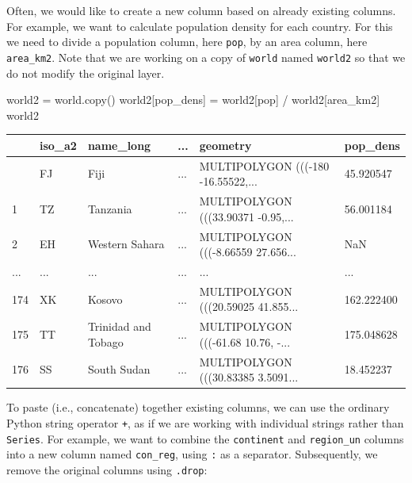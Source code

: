 \documentclass[
  letterpaper,
]{krantz}
\newenvironment{Shaded}{\begin{snugshade}}{\end{snugshade}}
\newcommand{\NormalTok}[1]{\textcolor[rgb]{0.00,0.23,0.31}{#1}}
\newcommand{\OperatorTok}[1]{\textcolor[rgb]{0.37,0.37,0.37}{#1}}
\newcommand{\StringTok}[1]{\textcolor[rgb]{0.13,0.47,0.30}{#1}}
\begin{document}
Often, we would like to create a new column based on already existing
columns. For example, we want to calculate population density for each
country. For this we need to divide a population column, here
\texttt{pop}, by an area column, here \texttt{area\_km2}. Note that we
are working on a copy of \texttt{world} named \texttt{world2} so that we
do not modify the original layer.

\begin{Shaded}
\begin{Highlighting}[]
\NormalTok{world2 }\OperatorTok{=}\NormalTok{ world.copy()}
\NormalTok{world2[}\StringTok{\textquotesingle{}pop\_dens\textquotesingle{}}\NormalTok{] }\OperatorTok{=}\NormalTok{ world2[}\StringTok{\textquotesingle{}pop\textquotesingle{}}\NormalTok{] }\OperatorTok{/}\NormalTok{ world2[}\StringTok{\textquotesingle{}area\_km2\textquotesingle{}}\NormalTok{]}
\NormalTok{world2}
\end{Highlighting}
\end{Shaded}

\begin{longtable}[]{@{}llllll@{}}
\toprule\noalign{}
& iso\_a2 & name\_long & ... & geometry & pop\_dens \\
\midrule\noalign{}
\endhead
\bottomrule\noalign{}
\endlastfoot
0 & FJ & Fiji & ... & MULTIPOLYGON (((-180 -16.55522,... & 45.920547 \\
1 & TZ & Tanzania & ... & MULTIPOLYGON (((33.90371 -0.95,... &
56.001184 \\
2 & EH & Western Sahara & ... & MULTIPOLYGON (((-8.66559 27.656... &
NaN \\
... & ... & ... & ... & ... & ... \\
174 & XK & Kosovo & ... & MULTIPOLYGON (((20.59025 41.855... &
162.222400 \\
175 & TT & Trinidad and Tobago & ... & MULTIPOLYGON (((-61.68 10.76,
-... & 175.048628 \\
176 & SS & South Sudan & ... & MULTIPOLYGON (((30.83385 3.5091... &
18.452237 \\
\end{longtable}

To paste (i.e., concatenate) together existing columns, we can use the
ordinary Python string operator \texttt{+}, as if we are working with
individual strings rather than \texttt{Series}. For example, we want to
combine the \texttt{continent} and \texttt{region\_un} columns into a
new column named \texttt{con\_reg}, using
\texttt{\textquotesingle{}:\textquotesingle{}} as a separator.
Subsequently, we remove the original columns using \texttt{.drop}:
\end{document}
